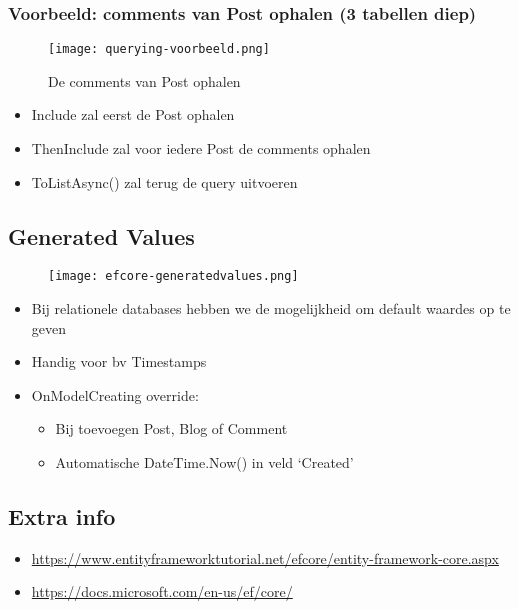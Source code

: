 \documentclass{article}
\begin{document}
\subsubsection{Voorbeeld: comments van Post ophalen (3 tabellen diep)}

\begin{figure}[H]
    \centering
    \texttt{[image: querying-voorbeeld.png]}
    \caption{De comments van Post ophalen}
\end{figure}


\begin{itemize}
    \item Include zal eerst de Post ophalen
    \item ThenInclude zal voor iedere Post de comments ophalen
    \item ToListAsync() zal terug de query uitvoeren
\end{itemize}

\subsection{Generated Values}

\begin{figure}[H]
    \centering
    \texttt{[image: efcore-generatedvalues.png]}
    \caption{}
\end{figure}


\begin{itemize}
    \item Bij relationele databases hebben we de mogelijkheid om default waardes op te geven
    \item Handig voor bv Timestamps
    \item OnModelCreating override:
    \begin{itemize}
        \item Bij toevoegen Post, Blog of Comment
        \item Automatische DateTime.Now() in veld `Created'
    \end{itemize}
\end{itemize}

\subsection{Extra info}

\begin{itemize}
    \item \url{https://www.entityframeworktutorial.net/efcore/entity-framework-core.aspx}
    \item \url{https://docs.microsoft.com/en-us/ef/core/}
\end{itemize}
\end{document}
